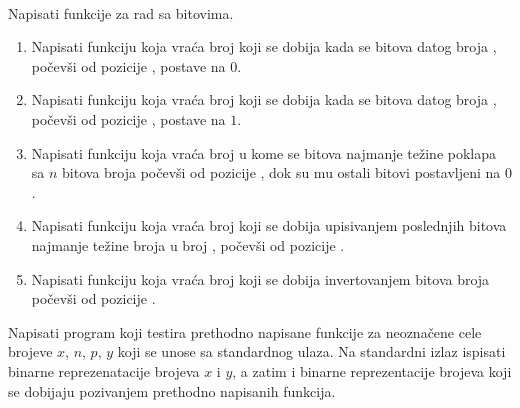 \begin{Answer}[ref=1_07]
\\
\end{Answer}


\begin{Exercise}[label=1_08]
Napisati funkcije za rad sa bitovima. 
\begin{enumerate}
\item Napisati funkciju  koja vraća broj koji se dobija kada se  bitova datog broja , počevši od pozicije , postave na $0$.
\item Napisati funkciju  koja vraća broj koji se dobija kada se  bitova datog broja , počevši od pozicije , postave na $1$.
\item %
Napisati funkciju  koja vraća broj u kome se  bitova najmanje težine poklapa sa $n$ bitova broja  počevši od pozicije , dok su mu ostali bitovi postavljeni na $0$.
\item %
Napisati funkciju  koja vraća broj koji se dobija upisivanjem poslednjih  bitova najmanje težine broja  u broj , počevši od pozicije .
\item Napisati funkciju  koja vraća broj koji se dobija invertovanjem  bitova broja  počevši od pozicije . 
\end{enumerate}

Napisati program koji testira prethodno napisane funkcije za neoznačene cele brojeve $x$, $n$, $p$, $y$ koji se unose sa standardnog ulaza. Na standardni izlaz ispisati binarne reprezenatacije brojeva $x$ i $y$, a zatim i binarne reprezentacije brojeva koji se dobijaju pozivanjem prethodno napisanih funkcija. 


\end{Exercise}
